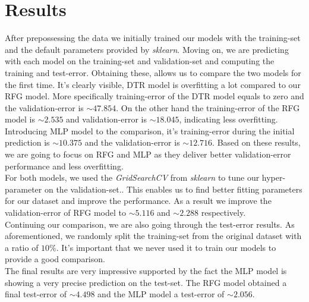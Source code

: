 \documentclass[12pt]{article}
\begin{document}
\section{Results}
After prepossessing the data we initially trained our models with the training-set and the default parameters provided by \textit{sklearn}. Moving on, we are predicting with each model on the training-set and validation-set and computing the training and test-error. Obtaining these, allows us to compare the two models for the first time. It's clearly visible, DTR model is overfitting a lot compared to our RFG model. More specifically training-error of the DTR model equals to zero and the validation-error is $\sim47.854$. On the other hand the training-error of the RFG model is $\sim2.535$ and validation-error is $\sim18.045$, indicating less overfitting. 
Introducing MLP model to the comparison, it's training-error during the initial prediction is $\sim10.375$ and the validation-error is $\sim12.716$.
Based on these results, we are going to focus on RFG and MLP as they deliver better validation-error performance and less overfitting.\\
For both models, we used the \textit{GridSearchCV} from \textit{sklearn} to tune our hyper-parameter on the validation-set.\cite{scikit-learn-GridSearchCV}. This enables us to find better fitting parameters for our dataset and improve the performance. As a result we improve the validation-error of RFG model to $\sim5.116$ and $\sim2.288$ respectively.\\

Continuing our comparison, we are also going through the test-error results. As aforementioned, we randomly split the training-set from the original dataset with a ratio of $10\%$. It's important that we never used it to train our models to provide a good comparison.\\

The final results are very impressive supported by the fact the MLP model is showing a very precise prediction on the test-set. The RFG model obtained a final test-error of $\sim4.498$ and the MLP model a test-error of $\sim2.056$.\\
\end{document}
